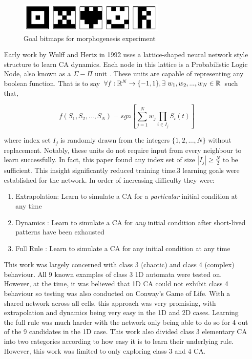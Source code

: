 \begin{figure}[!h]
\centering
\includegraphics[width=.5\textwidth]{images/bitmap-goals.png}
\caption{Goal bitmaps for morphogenesis experiment\cite{breukelaar2004evolving}}
\label{fig:nca}
\end{figure}

Early work by Wulff and Hertz in 1992\cite{wulff1992learning} uses a lattice-shaped neural network style structure to learn CA dynamics. Each node in this lattice is a Probabilistic Logic Node, also known as a $\Sigma-\Pi$ unit \cite{gurney1992training}. These units are capable of representing any boolean function. That is to say $ \forall f: \mathbb{R}^N \to \{-1, 1\}, \exists~w_1, w_2, ... , w_N \in \mathbb{R} $ such that,

\begin{equation} \label{eq:sigma_pi}
f(S_1, S_2, ..., S_N) = sgn\left[ \sum_{j=1}^{N} w_j \prod_{i \in I_j} S_i(t) \right]
\end{equation}

where index set $I_j$ is randomly drawn from the integers $\{1, 2, ..., N\}$ without replacement. Notably, these units do not require input from every neighbour to learn successfully. In fact, this paper found any index set of size $|I_j| \geq \frac{N}{2}$ to be sufficient. This insight significantly reduced training time.3 learning goals were established for the network. In order of increasing difficulty they were:

\begin{enumerate}
  \item Extrapolation: Learn to simulate a CA for a \textit{particular} initial condition at any time
  \item Dynamics : Learn to simulate a CA for \textit{any} initial condition after short-lived patterns have been exhausted
  \item Full Rule : Learn to simulate a CA for any initial condition at any time
\end{enumerate}

This work was largely concerned with class 3 (chaotic) and class 4 (complex) behaviour.  All 9 known examples of class 3 1D automata were tested on. However, at the time, it was believed that 1D CA could not exhibit class 4 behaviour so testing was also conducted on Conway's Game of Life. With a shared network across all cells, this approach was very promising, with extrapolation and dynamics being very easy in the 1D and 2D cases. Learning the full rule was much harder with the network only being able to do so for 4 out of the 9 candidates in the 1D case. This work also divided class 3 elementary CA into two categories according to how easy it is to learn their underlying rule. However, this work was limited to only exploring class 3 and 4 CA.\\

